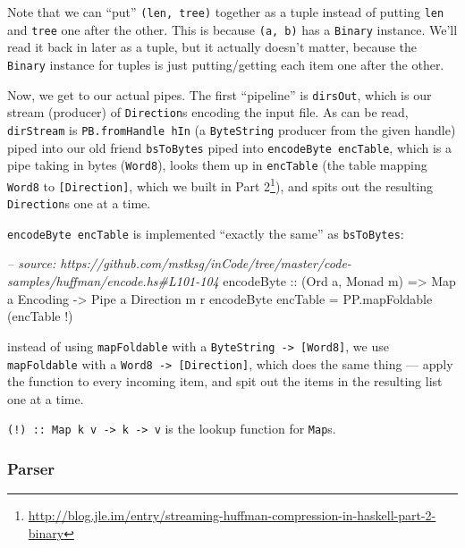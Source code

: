 \documentclass[]{article}
\newenvironment{Shaded}{\begin{snugshade}}{\end{snugshade}}
\newcommand{\CommentTok}[1]{\textcolor[rgb]{0.56,0.35,0.01}{\textit{#1}}}
\newcommand{\DataTypeTok}[1]{\textcolor[rgb]{0.13,0.29,0.53}{#1}}
\newcommand{\FunctionTok}[1]{\textcolor[rgb]{0.00,0.00,0.00}{#1}}
\newcommand{\NormalTok}[1]{#1}
\newcommand{\OtherTok}[1]{\textcolor[rgb]{0.56,0.35,0.01}{#1}}
\renewcommand{\href}[2]{#2\footnote{\url{#1}}}
\begin{document}
Note that we can ``put'' \texttt{(len,\ tree)} together as a tuple instead of
putting \texttt{len} and \texttt{tree} one after the other. This is because
\texttt{(a,\ b)} has a \texttt{Binary} instance. We'll read it back in later as
a tuple, but it actually doesn't matter, because the \texttt{Binary} instance
for tuples is just putting/getting each item one after the other.

Now, we get to our actual pipes. The first ``pipeline'' is \texttt{dirsOut},
which is our stream (producer) of \texttt{Direction}s encoding the input file.
As can be read, \texttt{dirStream} is \texttt{PB.fromHandle\ hIn} (a
\texttt{ByteString} producer from the given handle) piped into our old friend
\texttt{bsToBytes} piped into \texttt{encodeByte\ encTable}, which is a pipe
taking in bytes (\texttt{Word8}), looks them up in \texttt{encTable} (the table
mapping \texttt{Word8} to \texttt{{[}Direction{]}}, which we built in
\href{http://blog.jle.im/entry/streaming-huffman-compression-in-haskell-part-2-binary}{Part
2}), and spits out the resulting \texttt{Direction}s one at a time.

\texttt{encodeByte\ encTable} is implemented ``exactly the same'' as
\texttt{bsToBytes}:

\begin{Shaded}
\begin{Highlighting}[]
\CommentTok{-- source: https://github.com/mstksg/inCode/tree/master/code-samples/huffman/encode.hs#L101-104}
\OtherTok{encodeByte ::}\NormalTok{ (}\DataTypeTok{Ord}\NormalTok{ a, }\DataTypeTok{Monad}\NormalTok{ m)}
           \OtherTok{=>} \DataTypeTok{Map}\NormalTok{ a }\DataTypeTok{Encoding}
           \OtherTok{->} \DataTypeTok{Pipe}\NormalTok{ a }\DataTypeTok{Direction}\NormalTok{ m r}
\NormalTok{encodeByte encTable }\FunctionTok{=}\NormalTok{ PP.mapFoldable (encTable }\FunctionTok{!}\NormalTok{)}
\end{Highlighting}
\end{Shaded}

instead of using \texttt{mapFoldable} with a
\texttt{ByteString\ -\textgreater{}\ {[}Word8{]}}, we use \texttt{mapFoldable}
with a \texttt{Word8\ -\textgreater{}\ {[}Direction{]}}, which does the same
thing --- apply the function to every incoming item, and spit out the items in
the resulting list one at a time.

\texttt{(!)\ ::\ Map\ k\ v\ -\textgreater{}\ k\ -\textgreater{}\ v} is the
lookup function for \texttt{Map}s.

\hypertarget{parser}{%
\subsubsection{Parser}\label{parser}}
\end{document}
